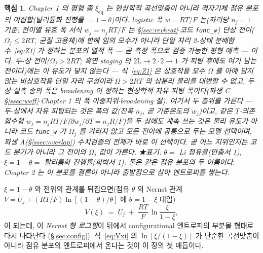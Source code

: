 \documentclass[11pt,a4paper]{article}
\newtheorem*{keybox}{핵심}
\newcommand{\eq}{\mathrm{eq}}
\begin{document}
\begin{keybox}
Chapter 1 의 평형 종 $\xi_\eq$ 는 \emph{현상학적 곡선맞춤}이 아니라 \emph{격자기체 점유 분포의 여집합}(탈리튬화
진행률 $=1-\theta$)이다. logistic 폭 $w=RT/F$ 는(자리당 $n_j{=}1$ 기준; 전이별 유효 폭 서식 $w_j=n_jRT/F$ 는
\S\ref{sec:revheat}$\cdot$코드 \texttt{func\_w}) \emph{단상 전이($\Omega_j\le2RT$, 균질 고용체)에 한해} 임의
모수가 아니라 단일 자리 2-상태 분배함수~\eqref{eq:Z1} 가 정하는 분포의 열적 폭 — 곧 측정 폭으로 검증
가능한 \emph{평형 예측} — 이다. \emph{두-상 전이}($\Omega_j>2RT$; 흑연 staging 의
$2\mathrm L\!\to\!2\cdot2\!\to\!1$ 가 피팅 후에도 여기 남는 전이다)에는 이 유도가 닿지 않는다 —
식~\eqref{eq:Z1} 은 상호작용 모수 $\Omega$ 를 아예 담지 않는 \emph{비상호작용 단일 자리} 구성이라
$\Omega>2RT$ 의 상분리 물리를 대변할 수 없고, 두-상 실측 종의 폭은 broadening 이 정하는 \emph{현상학적
자유 피팅 폭}이다(파생 C \S\ref{ssec:weff}$\cdot$Chapter 1 의 폭 이중지위$\cdot$broadening 절). 여기서
두 층위를 가른다 — 두-상에서 자유 피팅되는 것은 폭의 \emph{값}(진폭 $n_j$, 곧 기준온도의 $w_j$)이고,
같은 $T$-의존 \emph{함수형} $w_j=n_jRT/F$($\partial w_j/\partial T=n_jR/F$)을 두-상에도 계속 쓰는 것은
물리 유도가 아니라 코드 \texttt{func\_w} 가 $\Omega_j$ 를 가리지 않고 모든 전이에 공통으로 두는
\emph{모델 선택}이며, 파생 A(\S\ref{ssec:overlap}) 수치검증의 전제가 바로 이 선택이다. 곧 어느 지위인지는
코드 분기가 아니라 그 전이의 $\Omega_j$ 값이 가른다. ★표기: $\theta=$ Li 점유율(만충서 1),
$\xi=1-\theta=$ 탈리튬화 진행률(희박서 1); 둘은 같은 점유 분포의 두 이름이다. Chapter 2 는 이 분포를
결론이 아니라 출발점으로 삼아 엔트로피를 쌓는다.
\end{keybox}

$\xi=1-\theta$ 와 전위의 관계를 뒤집으면(점유 $\theta$ 의 Nernst 관계 $V=U_j+(RT/F)\ln[(1-\theta)/\theta]$ 에
$\theta=1-\xi$ 대입)
\begin{equation}
V(\xi) \;=\; U_j \;+\; \frac{RT}{F}\,\ln\!\frac{\xi}{1-\xi},
\label{eq:Vxi}
\end{equation}
이 되는데, 이 \emph{Nernst 형 로그항}이 뒤에서 configurational 엔트로피의 부분몰 형태로 다시 나타난다
(\S\ref{sec:config}). 식~\eqref{eq:Vxi} 의 $\ln[\xi/(1-\xi)]$ 가 단순한 곡선맞춤이 아니라 점유 분포의
엔트로피에서 온다는 것이 이 장의 첫 매듭이다.
\end{document}
